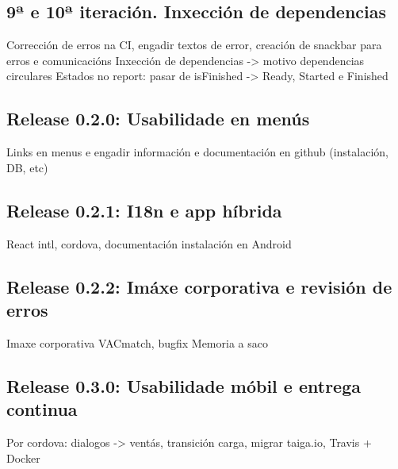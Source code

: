     \subsection{9ª e 10ª iteración. Inxección de dependencias}
    Corrección de erros na CI, engadir textos de error, creación de snackbar para erros e comunicacións
    Inxección de dependencias -> motivo dependencias circulares
    Estados no report: pasar de isFinished -> Ready, Started e Finished

    \subsection{Release 0.2.0: Usabilidade en menús}
    Links en menus e engadir información e documentación en github (instalación, DB, etc)

    \subsection{Release 0.2.1: I18n e app híbrida}
    React intl, cordova, documentación instalación en Android

    \subsection{Release 0.2.2: Imáxe corporativa e revisión de erros}
    Imaxe corporativa VACmatch, bugfix
    Memoria a saco

    \subsection{Release 0.3.0: Usabilidade móbil e entrega continua}
    Por cordova: dialogos -> ventás, transición carga, migrar taiga.io, Travis + Docker